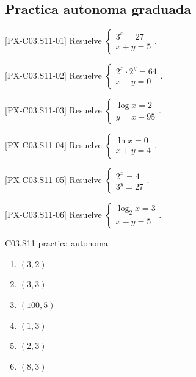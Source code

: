 \subsection*{Practica autonoma graduada}
\begin{exercise}{[PX-C03.S11-01] Resuelve \(\begin{cases}3^x=27\\ x+y=5\end{cases}\).}
\end{exercise}
\begin{exercise}{[PX-C03.S11-02] Resuelve \(\begin{cases}2^x\cdot 2^y=64\\ x-y=0\end{cases}\).}
\end{exercise}
\begin{exercise}{[PX-C03.S11-03] Resuelve \(\begin{cases}\log x=2\\ y=x-95\end{cases}\).}
\end{exercise}
\begin{exercise}{[PX-C03.S11-04] Resuelve \(\begin{cases}\ln x=0\\ x+y=4\end{cases}\).}
\end{exercise}
\begin{exercise}{[PX-C03.S11-05] Resuelve \(\begin{cases}2^x=4\\ 3^y=27\end{cases}\).}
\end{exercise}
\begin{exercise}{[PX-C03.S11-06] Resuelve \(\begin{cases}\log_2 x=3\\ x-y=5\end{cases}\).}
\end{exercise}

\begin{shortanswer}{C03.S11 practica autonoma}
\begin{enumerate}[label=\textbf{PX-C03.S11-\arabic*:}, leftmargin=*]
  \item \((3,2)\)
  \item \((3,3)\)
  \item \((100,5)\)
  \item \((1,3)\)
  \item \((2,3)\)
  \item \((8,3)\)
\end{enumerate}
\end{shortanswer}

